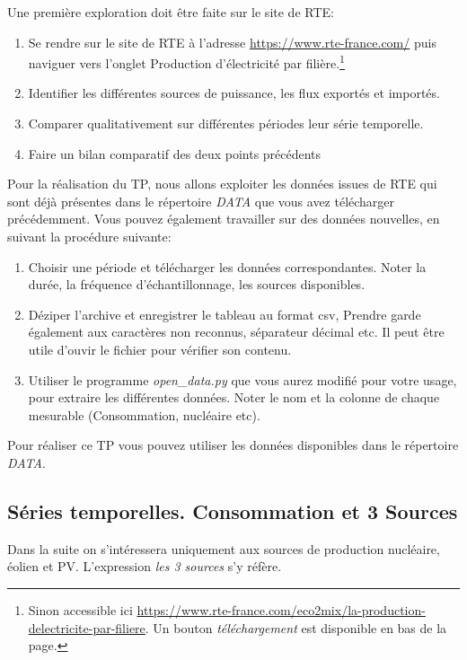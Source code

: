 \documentclass[12pt,a4,french]{article}
\newcommand{\tmtextit}[1]{{\itshape{#1}}}
\begin{document}
Une première exploration doit être faite sur le site de RTE:
\begin{enumerate}
  \item Se rendre sur le site de RTE à l'adresse 
  \href{https://www.rte-france.com/}{https://www.rte-france.com/} puis naviguer vers l'onglet Production d'électricité par filière.\footnote{Sinon accessible ici \href{https://www.rte-france.com/eco2mix/la-production-delectricite-par-filiere}{https://www.rte-france.com/eco2mix/la-production-delectricite-par-filiere}. Un bouton \textit{téléchargement} est disponible en bas de la page.}
  
  \item Identifier les différentes sources de puissance, les flux exportés et importés.
  
  \item Comparer qualitativement sur différentes périodes leur série temporelle.
  
  \item Faire un bilan comparatif des deux points précédents
\end{enumerate}

Pour la réalisation du TP, nous allons exploiter les données issues de RTE qui sont déjà présentes dans le répertoire \textit{DATA} que vous avez télécharger précédemment. Vous pouvez également travailler sur des données nouvelles, en suivant la procédure suivante:
  \begin{enumerate}  
  \item Choisir une période et télécharger les données
  correspondantes. Noter la durée, la fréquence d'échantillonnage, les
  sources disponibles. 
  
  \item Déziper l'archive et enregistrer le
  tableau au format csv, Prendre garde également aux caractères non   reconnus, séparateur décimal etc. Il peut être utile d'ouvir le fichier pour vérifier son contenu.
  
  \item Utiliser le programme \tmtextit{open\_data.py} que vous aurez modifié
  pour votre usage, pour extraire les différentes données. Noter le nom et
  la colonne de chaque mesurable (Consommation, nucléaire etc). 
\end{enumerate}

Pour réaliser ce TP vous pouvez utiliser les données disponibles dans le répertoire \tmtextit{DATA}.



\subsection{Séries temporelles. Consommation et 3 Sources} \label{serie_temporelle}
Dans la suite on s’intéressera uniquement aux sources de production
nucléaire, éolien et PV. L'expression \tmtextit{les 3 sources} s'y
réfère.
\end{document}
